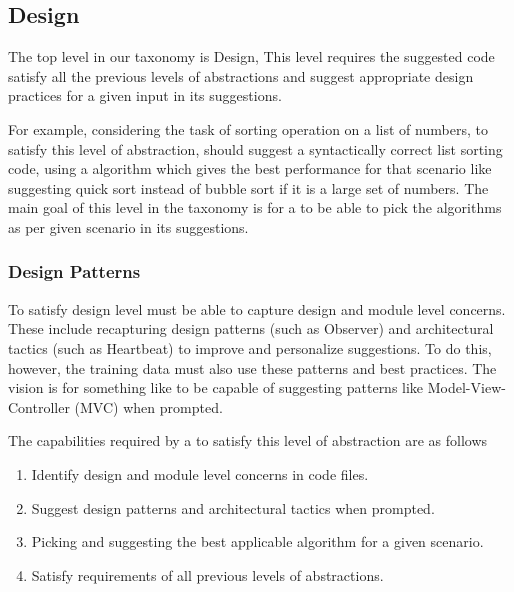 \subsection{Design}
\label{design}
The top level in our taxonomy is Design, This level requires the suggested code satisfy all the previous levels of abstractions and suggest appropriate design practices for a given input in its suggestions.

For example, considering the task of sorting operation on a list of numbers, to satisfy this level of abstraction, \cct should suggest a syntactically correct list sorting code, using a algorithm which gives the best performance for that scenario like suggesting quick sort instead of bubble sort if it is a large set of numbers. The main goal of this level in the taxonomy is for a \cct{} to be able to pick the algorithms as per given scenario in its suggestions.

\subsubsection{Design Patterns}
\label{patterns}
To satisfy design level \cct{} must be able to capture design and module level concerns. 
These include recapturing design patterns (such as Observer) and architectural tactics (such as Heartbeat) to improve and personalize suggestions. 
To do this, however, the training data must also use these patterns and best practices.
The vision is for something like \cop{} to be capable of suggesting patterns like Model-View-Controller (MVC) when prompted. 

The capabilities required by a \cct{} to satisfy this level of abstraction are as follows
\begin{enumerate}
    \item Identify design and module level concerns in code files.
    \item Suggest design patterns and architectural tactics when prompted.
    \item Picking and suggesting the best applicable algorithm for a given scenario.
    \item Satisfy requirements of all previous levels of abstractions.
\end{enumerate}